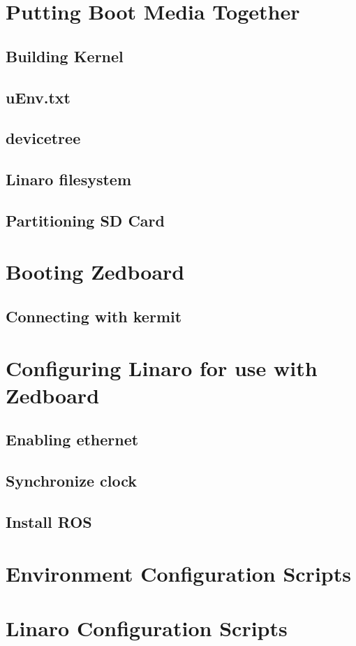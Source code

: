\documentclass[thesis.tex]{subfile}
\begin{document}
\section{Putting Boot Media Together}
\subsection{Building Kernel}
\subsection{uEnv.txt}
\subsection{devicetree}
\subsection{Linaro filesystem}
\subsection{Partitioning SD Card}

\section{Booting Zedboard}
\subsection{Connecting with kermit}

\section{Configuring Linaro for use with Zedboard}
\subsection{Enabling ethernet}
\subsection{Synchronize clock}
\subsection{Install ROS}

\appendix
\section{Environment Configuration Scripts}
\section{Linaro Configuration Scripts}


\end{document}
